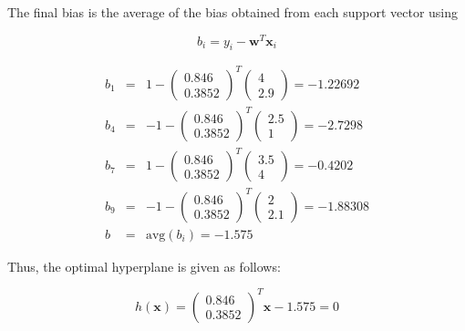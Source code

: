 \documentclass[11pt]{article}
\begin{document}
\begin{enumerate}
\begin{enumerate}
The final bias is the average of the bias obtained from each support vector using

\begin{equation*}
b_i = y_i - \mathbf{w}^\mathit{T} \mathbf{x}_i
\end{equation*}

\begin{eqnarray*}
b_1 &=& 
1 - \left( \begin{array}{c} 0.846 \\ 0.3852 \end{array} \right)^\mathit{T}
\left( \begin{array}{c} 4 \\ 2.9 \end{array} \right)
= -1.22692 \\
b_4 &=& 
-1 - \left( \begin{array}{c} 0.846 \\ 0.3852 \end{array} \right)^\mathit{T}
\left( \begin{array}{c} 2.5 \\ 1 \end{array} \right)
= -2.7298 \\
b_7 &=& 
1 - \left( \begin{array}{c} 0.846 \\ 0.3852 \end{array} \right)^\mathit{T}
\left( \begin{array}{c} 3.5 \\ 4 \end{array} \right)
= -0.4202 \\
b_9 &=& 
-1 - \left( \begin{array}{c} 0.846 \\ 0.3852 \end{array} \right)^\mathit{T}
\left( \begin{array}{c} 2 \\ 2.1 \end{array} \right)
= -1.88308 \\
b &=& \text{avg}(b_i) = -1.575
\end{eqnarray*}

Thus, the optimal hyperplane is given as follows:

\begin{equation*}
h(\mathbf{x}) = \left( \begin{array}{c} 0.846 \\ 0.3852 \end{array} \right)^\mathit{T} \mathbf{x} - 1.575 = 0
\end{equation*}


\end{enumerate}
\end{enumerate}
\end{document}
